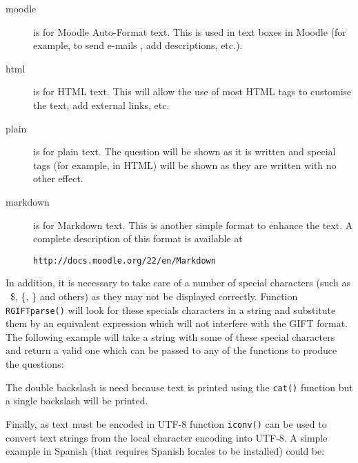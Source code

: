 \documentclass[a4paper]{article}
\newcommand{\code}[1]{\texttt{#1}}
\begin{document}
\begin{description}

\item[moodle] is for Moodle Auto-Format text. This is used in 
text boxes in Moodle (for example, to send e-mails , add descriptions, etc.).

\item[html] is for HTML text. This will allow the use of most HTML tags to
customise the text, add external links, etc.

\item[plain] is for plain text. The question will be shown as it is written
and special tags (for example, in HTML) will be shown as they are written with
no other effect.

\item[markdown] is for Markdown text. This is another simple format to enhance
the text. A complete description of this format is available at 

\verb+http://docs.moodle.org/22/en/Markdown+

\end{description}


In addition, it is necessary to take care of a number of special
characters (such as \, \$, \{, \} and others) as they may not be displayed
correctly. Function \code{RGIFTparse()}
will look for these specials characters in a string and substitute them
by an equivalent expression which will not interfere with the GIFT format.
The following example will take a string with some of these special
characters and return a valid one which can be passed to any of the
functions to produce the questions:

\begin{Schunk}
\end{Schunk}
\noindent
The double backslash is need because text is printed using the \code{cat()}
function but a single backslash will be printed.


Finally, as text must be encoded in UTF-8 function \code{iconv()} can be used
to convert  text strings from the local character encoding into UTF-8.
A simple example in Spanish (that requires Spanish locales to be installed) could be:
\end{document}
